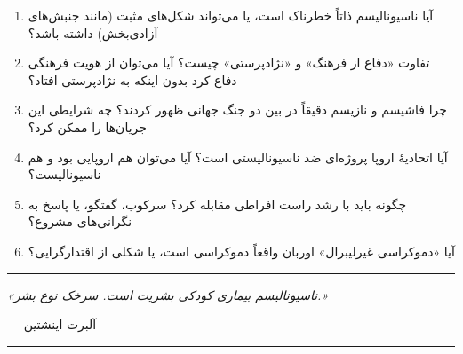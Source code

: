 \begin{tcolorbox}[
    enhanced,
    colback=centergreen!8,
    colframe=centergreen,
    boxrule=1.5pt,
    arc=5pt,
    fonttitle=\bfseries,
    title={\rl{❓ پرسش‌هایی برای تأمل و بحث}}
]
\begin{enumerate}
    \item آیا ناسیونالیسم ذاتاً خطرناک است، یا می‌تواند شکل‌های مثبت (مانند جنبش‌های آزادی‌بخش) داشته باشد؟
    
    \item تفاوت «دفاع از فرهنگ» و «نژادپرستی» چیست؟ آیا می‌توان از هویت فرهنگی دفاع کرد بدون اینکه به نژادپرستی افتاد؟
    
    \item چرا فاشیسم و نازیسم دقیقاً در بین دو جنگ جهانی ظهور کردند؟ چه شرایطی این جریان‌ها را ممکن کرد؟
    
    \item آیا اتحادیهٔ اروپا پروژه‌ای ضد ناسیونالیستی است؟ آیا می‌توان هم اروپایی بود و هم ناسیونالیست؟
    
    \item چگونه باید با رشد راست افراطی مقابله کرد؟ سرکوب، گفتگو، یا پاسخ به نگرانی‌های مشروع؟
    
    \item آیا «دموکراسی غیرلیبرال» اوربان واقعاً دموکراسی است، یا شکلی از اقتدارگرایی؟
\end{enumerate}
\end{tcolorbox}

\vspace{10mm}
\begin{center}
\rule{0.6\textwidth}{1pt}

\vspace{3mm}
\textit{«ناسیونالیسم بیماری کودکی بشریت است. سرخک نوع بشر.»}

\vspace{2mm}
--- آلبرت اینشتین

\vspace{3mm}
\rule{0.6\textwidth}{1pt}
\end{center}

